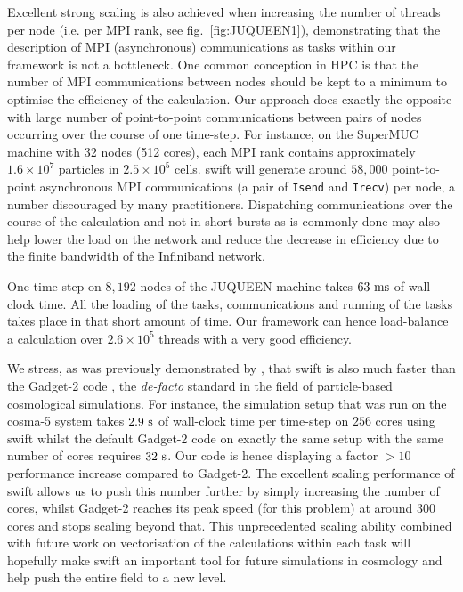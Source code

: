 \documentclass{sig-alternate-05-2015}
\newcommand{\gadget}{{\sc Gadget-2}\xspace}
\newcommand{\swift}{{\sc swift}\xspace}
\begin{document}
Excellent strong scaling is also achieved when increasing the number of threads
per node (i.e. per MPI rank, see fig.~\ref{fig:JUQUEEN1}), demonstrating that
the description of MPI (asynchronous) communications as tasks within our
framework is not a bottleneck. One common conception in HPC is that the number
of MPI communications between nodes should be kept to a minimum to optimise the
efficiency of the calculation. Our approach does exactly the opposite with large
number of point-to-point communications between pairs of nodes occurring over the
course of one time-step. For instance, on the SuperMUC machine with 32 nodes (512
cores), each MPI rank contains approximately $1.6\times10^7$ particles in
$2.5\times10^5$ cells. \swift will generate around $58,000$ point-to-point
asynchronous MPI communications (a pair of \texttt{Isend} and \texttt{Irecv})
per node, a number discouraged by many practitioners. Dispatching communications
over the course of the calculation and not in short bursts as is commonly done
may also help lower the load on the network and reduce the decrease in
efficiency due to the finite bandwidth of the Infiniband network.

One time-step on $8,192$ nodes of the JUQUEEN machine takes $63~\rm{ms}$ of
wall-clock time. All the loading of the tasks, communications and running of the
tasks takes place in that short amount of time. Our framework can hence
load-balance a calculation over $2.6\times10^5$ threads with a very good
efficiency.

We stress, as was previously demonstrated by \cite{ref:Gonnet2015}, that \swift
is also much faster than the \gadget code \cite{Springel2005}, the
\emph{de-facto} standard in the field of particle-based cosmological
simulations. For instance, the simulation setup that was run on the cosma-5
system takes $2.9~\rm{s}$ of wall-clock time per time-step on $256$ cores using
\swift whilst the default \gadget code on exactly the same setup with the same
number of cores requires $32~\rm{s}$. Our code is hence displaying a factor
$>10$ performance increase compared to \gadget. The excellent scaling
performance of \swift allows us to push this number further by simply increasing
the number of cores, whilst \gadget reaches its peak speed (for this problem) at
around 300 cores and stops scaling beyond that. This unprecedented scaling
ability combined with future work on vectorisation of the calculations within
each task will hopefully make \swift an important tool for future simulations in
cosmology and help push the entire field to a new level.
\end{document}
